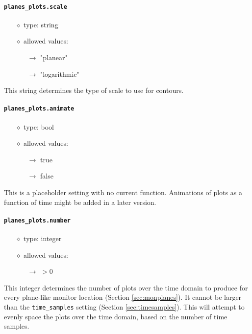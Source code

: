 \documentclass[]{article}
\def\code#1{\texttt{#1}}
\begin{document}
\paragraph{\code{planes\_plots.scale}}
\begin{itemize}
    \item[$\diamond$] type: string 
    \item[$\diamond$] allowed values:
    \begin{itemize}
        \item[$\rightarrow$] "planear"
        \item[$\rightarrow$] "logarithmic"
    \end{itemize}
\end{itemize}
This string determines the type of scale to use for contours.

\paragraph{\code{planes\_plots.animate}}
\begin{itemize}
    \item[$\diamond$] type: bool 
    \item[$\diamond$] allowed values:
    \begin{itemize}
        \item[$\rightarrow$] true
        \item[$\rightarrow$] false
    \end{itemize}
\end{itemize}
This is a placeholder setting with no current function. Animations of plots as
a function of time might be added in a later version.

\paragraph{\code{planes\_plots.number}}
\begin{itemize}
    \item[$\diamond$] type: integer 
    \item[$\diamond$] allowed values:
    \begin{itemize}
        \item[$\rightarrow$] $>0$
    \end{itemize}
\end{itemize}
This integer determines the number of plots over the time domain to produce for
every plane-like monitor location (Section \ref{sec:monplanes}). It cannot be
larger than the \code{time\_samples} setting (Section \ref{sec:timesamples}).
This will attempt to evenly space the plots over the time domain, based on the
number of time samples.
\end{document}

